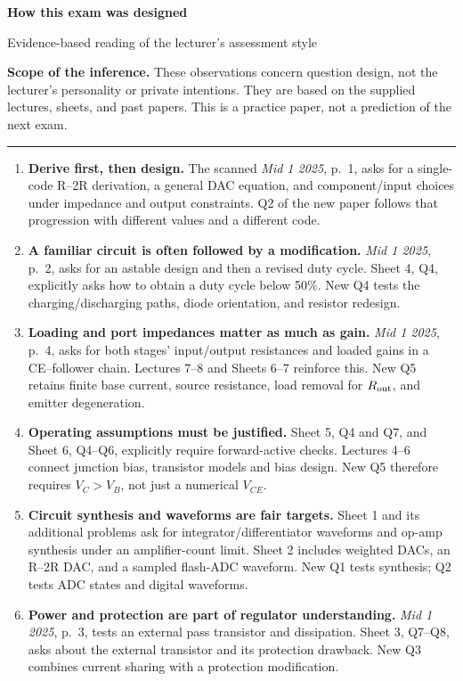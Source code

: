 \documentclass[11pt,a4paper]{article}
\begin{document}
{\Huge\bfseries\color{ink}How this exam was designed}\par
{\large Evidence-based reading of the lecturer's assessment style}\par
\textbf{Scope of the inference.} These observations concern question design, not the lecturer's personality or private intentions. They are based on the supplied lectures, sheets, and past papers. This is a practice paper, not a prediction of the next exam.

\par{}\par\hrule\vspace{6pt}
\begin{enumerate}
\item \textbf{Derive first, then design.} The scanned \emph{Mid 1 2025}, p.\ 1, asks for a single-code R--2R derivation, a general DAC equation, and component/input choices under impedance and output constraints. Q2 of the new paper follows that progression with different values and a different code.
\item \textbf{A familiar circuit is often followed by a modification.} \emph{Mid 1 2025}, p.\ 2, asks for an astable design and then a revised duty cycle. Sheet 4, Q4, explicitly asks how to obtain a duty cycle below 50\%. New Q4 tests the charging/discharging paths, diode orientation, and resistor redesign.
\item \textbf{Loading and port impedances matter as much as gain.} \emph{Mid 1 2025}, p.\ 4, asks for both stages' input/output resistances and loaded gains in a CE--follower chain. Lectures 7--8 and Sheets 6--7 reinforce this. New Q5 retains finite base current, source resistance, load removal for $R_{\rm out}$, and emitter degeneration.
\item \textbf{Operating assumptions must be justified.} Sheet 5, Q4 and Q7, and Sheet 6, Q4--Q6, explicitly require forward-active checks. Lectures 4--6 connect junction bias, transistor models and bias design. New Q5 therefore requires $V_C>V_B$, not just a numerical $V_{CE}$.
\item \textbf{Circuit synthesis and waveforms are fair targets.} Sheet 1 and its additional problems ask for integrator/differentiator waveforms and op-amp synthesis under an amplifier-count limit. Sheet 2 includes weighted DACs, an R--2R DAC, and a sampled flash-ADC waveform. New Q1 tests synthesis; Q2 tests ADC states and digital waveforms.
\item \textbf{Power and protection are part of regulator understanding.} \emph{Mid 1 2025}, p.\ 3, tests an external pass transistor and dissipation. Sheet 3, Q7--Q8, asks about the external transistor and its protection drawback. New Q3 combines current sharing with a protection modification.
\end{enumerate}
\end{document}
